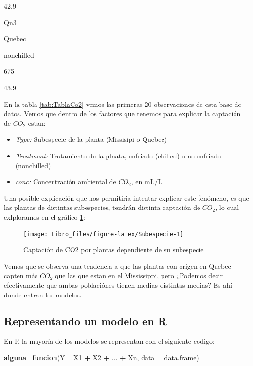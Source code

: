 \documentclass[]{book}
\newenvironment{Shaded}{\begin{snugshade}}{\end{snugshade}}
\newcommand{\DataTypeTok}[1]{\textcolor[rgb]{0.13,0.29,0.53}{#1}}
\newcommand{\KeywordTok}[1]{\textcolor[rgb]{0.13,0.29,0.53}{\textbf{#1}}}
\newcommand{\NormalTok}[1]{#1}
\newcommand{\OperatorTok}[1]{\textcolor[rgb]{0.81,0.36,0.00}{\textbf{#1}}}
\newcommand{\StringTok}[1]{\textcolor[rgb]{0.31,0.60,0.02}{#1}}
\providecommand{\tightlist}{%
  \setlength{\itemsep}{0pt}\setlength{\parskip}{0pt}}
\begin{document}
42.9

Qn3

Quebec

nonchilled

675

43.9

En la tabla \ref{tab:TablaCo2} vemos las primeras 20 observaciones de
esta base de datos. Vemos que dentro de los factores que tenemos para
explicar la captación de \(CO_2\) estan:

\begin{itemize}
\tightlist
\item
  \emph{Type:} Subespecie de la planta (Missisipi o Quebec)
\item
  \emph{Treatment:} Tratamiento de la plnata, enfriado (chilled) o no
  enfriado (nonchilled)
\item
  \emph{conc:} Concentración ambiental de \(CO_2\), en mL/L.
\end{itemize}

Una posible explicación que nos permitiría intentar explicar este
fenómeno, es que las plantas de distintas subespecies, tendrán distinta
captación de \(CO_2\), lo cual exlploramos en el gráfico
\ref{fig:Subespecie}:

\begin{figure}

{\centering \texttt{[image: Libro\_files/figure-latex/Subespecie-1]} 

}

\caption{Captación de CO2 por plantas dependiente de su subespecie}\label{fig:Subespecie}
\end{figure}

Vemos que se observa una tendencia a que las plantas con origen en
Quebec capten más \(CO_2\) que las que estan en el Mississippi, pero
¿Podemos decir efectivamente que ambas poblaciónes tienen medias
distintas medias? Es ahí donde entran los modelos.

\hypertarget{representando-un-modelo-en-r}{%
\subsection{Representando un modelo en
R}\label{representando-un-modelo-en-r}}

En R la mayoría de los modelos se representan con el siguiente codigo:

\begin{Shaded}
\begin{Highlighting}[]
\KeywordTok{alguna_funcion}\NormalTok{(Y }\OperatorTok{~}\StringTok{ }\NormalTok{X1 }\OperatorTok{+}\StringTok{ }\NormalTok{X2 }\OperatorTok{+}\StringTok{ }\NormalTok{... }\OperatorTok{+}\StringTok{ }\NormalTok{Xn, }\DataTypeTok{data =}\NormalTok{ data.frame)}
\end{Highlighting}
\end{Shaded}
\end{document}
